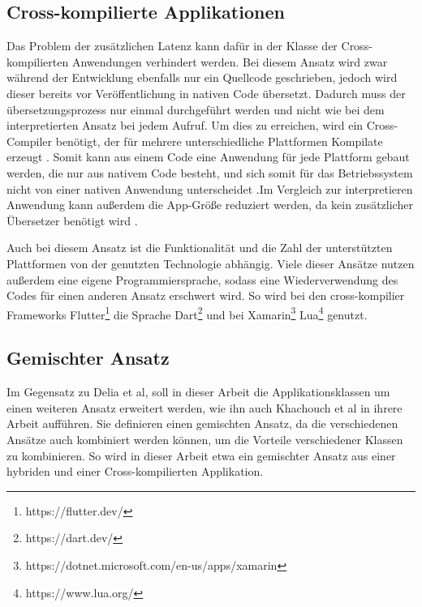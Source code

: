 \subsection{Cross-kompilierte Applikationen}
Das Problem der zusätzlichen Latenz kann dafür in der Klasse der Cross-kompilierten Anwendungen verhindert werden. Bei diesem Ansatz wird zwar während der Entwicklung ebenfalls nur ein Quellcode geschrieben, jedoch wird dieser bereits vor Veröffentlichung in nativen Code übersetzt. Dadurch muss der übersetzungsprozess nur einmal durchgeführt werden und nicht wie bei dem interpretierten Ansatz bei jedem Aufruf. Um dies zu erreichen, wird ein Cross-Compiler benötigt, der für mehrere unterschiedliche Plattformen Kompilate erzeugt \cite{mobiledraft_cross_plattform}. Somit kann aus einem Code eine Anwendung für jede Plattform gebaut werden, die nur aus nativem Code besteht, und sich somit für das Betriebssystem nicht von einer nativen Anwendung unterscheidet \cite{IEEE_development_classes}.Im Vergleich zur interpretieren Anwendung kann außerdem die App-Größe reduziert werden, da kein zusätzlicher Übersetzer benötigt wird \cite{mobiledraft_cross_plattform}.

Auch bei diesem Ansatz ist die Funktionalität und die Zahl der unterstützten Plattformen von der genutzten Technologie abhängig. Viele dieser Ansätze nutzen außerdem eine eigene Programmiersprache, sodass eine Wiederverwendung des Codes für einen anderen Ansatz erschwert wird. So wird bei den cross-kompilier Frameworks Flutter\footnote{https://flutter.dev/} die Sprache Dart\footnote{https://dart.dev/} und bei Xamarin\footnote{https://dotnet.microsoft.com/en-us/apps/xamarin} Lua\footnote{https://www.lua.org/} genutzt.


\subsection{Gemischter Ansatz}
Im Gegensatz zu Delia et al, soll in dieser Arbeit die Applikationsklassen um einen weiteren Ansatz erweitert werden, wie ihn auch Khachouch et al \cite{IEEE_Khackouch_Al} in ihrere Arbeit aufführen. Sie definieren einen gemischten Ansatz, da die verschiedenen Ansätze auch kombiniert werden können, um die Vorteile verschiedener Klassen zu kombinieren. So wird in dieser Arbeit etwa ein gemischter Ansatz aus einer hybriden und einer Cross-kompilierten Applikation.
